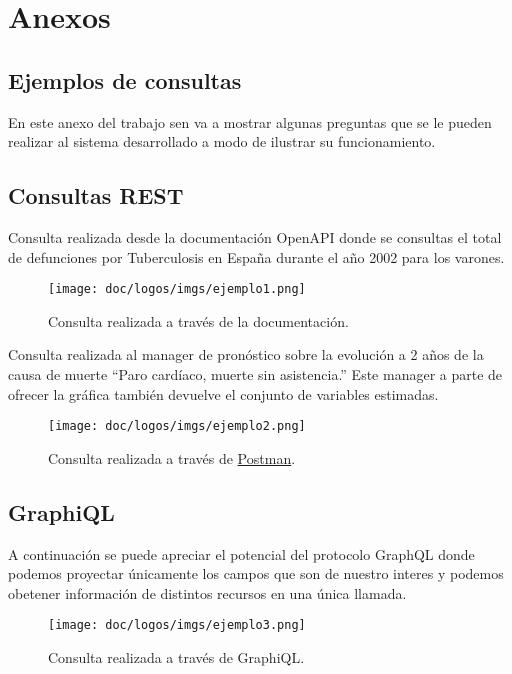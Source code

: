 \chapter{Anexos}

\section{Ejemplos de consultas} 
\label{sec:ejemplos}

En este anexo del trabajo sen va a mostrar algunas preguntas que se le pueden realizar al
sistema desarrollado a modo de ilustrar su
funcionamiento.

\section{Consultas REST}

Consulta realizada desde la documentación OpenAPI donde se consultas el total de defunciones
por Tuberculosis en España durante el año 2002 para los varones.
\FloatBarrier
\begin{figure}[h]
	\centering
	\texttt{[image: doc/logos/imgs/ejemplo1.png]}
	\caption{ Consulta realizada a través de la documentación. }
\end{figure}
\FloatBarrier

Consulta realizada al manager de pronóstico sobre la evolución a 2 años de la causa de
muerte ``Paro cardíaco, muerte sin asistencia.''
Este manager a parte de ofrecer la gráfica también devuelve el conjunto de variables
estimadas.
\FloatBarrier
\begin{figure}[h]
	\centering
	\texttt{[image: doc/logos/imgs/ejemplo2.png]}
	\caption{ Consulta realizada a través de \href{https://www.postman.com/}{Postman}. }
\end{figure}
\FloatBarrier

\section{GraphiQL}

A continuación se puede apreciar el potencial del protocolo GraphQL donde podemos
proyectar únicamente los campos que son de nuestro interes y podemos obetener información
de distintos recursos en una única llamada.
\FloatBarrier
\begin{figure}[h]
	\centering
	\texttt{[image: doc/logos/imgs/ejemplo3.png]}
	\caption{ Consulta realizada a través de GraphiQL. }
\end{figure}
\FloatBarrier

